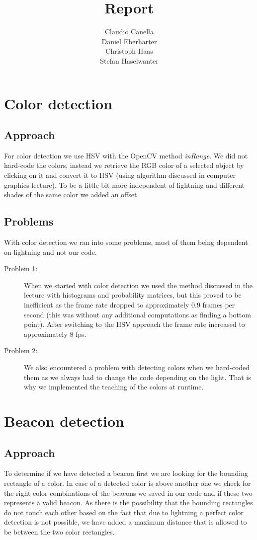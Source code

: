 \documentclass[703031]{iisreport}
\title{\textbf{Report}}
\author{Claudio Canella\\ Daniel Eberharter\\ Christoph Haas\\ Stefan Haselwanter}
\begin{document}
\maketitle


\section{Color detection}
\subsection{Approach}
For color detection we use HSV with the OpenCV method \emph{inRange}. We did not hard-code the colors, instead we retrieve the RGB color of a selected object by clicking on it and convert it to HSV (using algorithm discussed in computer graphics lecture). To be a little bit more independent of lightning and different shades of the same color we added an offset.

\subsection{Problems}
With color detection we ran into some problems, most of them being dependent on lightning and not our code.
	\begin{description}
		\item [Problem 1:] When we started with color detection we used the method discussed in the lecture with histograms and probability matrices, but this proved to be inefficient as the frame rate dropped to approximately 0.9 frames per second (this was without any additional computations as finding a bottom point). After switching to the HSV approach the frame rate increased to approximately 8 fps.
		\item [Problem 2:] We also encountered a problem with detecting colors when we hard-coded them as we always had to change the code depending on the light. That is why we implemented the teaching of the colors at runtime. \label{Color-Teaching}
	\end{description}


\section{Beacon detection}
\subsection{Approach}
To determine if we have detected a beacon first we are looking for the bounding rectangle of a color. In case of a detected color is above another one we check for the right color combinations of the beacons we saved in our code and if these two represents a valid beacon. As there is the possibility that the bounding rectangles do not touch each other based on the fact that due to lightning a perfect color detection is not possible, we have added a maximum distance that is allowed to be between the two color rectangles.
\end{document}
